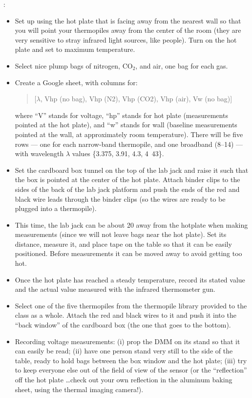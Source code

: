 :
	\begin{itemize}
	\item Set up using the hot plate that is facing away from the nearest wall so that you will point your thermopiles away from the center of the room (they are very sensitive to stray infrared light sources, like people). Turn on the hot plate and set to maximum temperature.
	\item Select nice plump bags of nitrogen, $\text{CO}_2$, and air, one bag for each gas.
	\item Create a Google sheet, with columns for: 
		\begin{quote}
		[$\lambda$, Vhp (no bag), Vhp (N2), Vhp (CO2), Vhp (air), Vw (no bag)]%
		\end{quote}
	where ``V'' stands for voltage, ``hp'' stands for hot plate (measurements pointed at the hot plate), and ``w'' stands for wall (baseline measurements pointed at the wall, at approximately room temperature). There will be five rows --- one for each narrow-band thermopile, and one broadband (8--\unit{14}{\micro\meter}) --- with wavelength $\lambda$ values \{3.375, 3.91, 4.3, \unit{4.43}{\micro\meter}\}.
	\item Set the cardboard box tunnel on the top of the lab jack and raise it such that the box is pointed at the center of the hot plate.  Attach binder clips to the sides of the back of the lab jack platform and push the ends of the red and black wire leads through the binder clips (so the wires are ready to be plugged into a thermopile).  
	\item This time, the lab jack can be about \unit{20}{\centi\meter} away from the hotplate when making measurements (since we will not leave bags near the hot plate). Set its distance, measure it, and place tape on the table so that it can be easily positioned.  Before measurements it can be moved away to avoid getting too hot.
	\item Once the hot plate has reached a steady temperature, record its stated value and the actual value measured with the infrared thermometer gun.
	\item Select one of the five thermopiles from the thermopile library provided to the class as a whole. Attach the red and black wires to it and push it into the ``back window'' of the cardboard box (the one that goes to the bottom).
	\item Recording voltage measurements: (i) prop the DMM on its stand so that it can easily be read; (ii) have one person stand very still to the side of the table, ready to hold bags between the box window and the hot plate; (iii) try to keep everyone else out of the field of view of the sensor (or the ``reflection'' off the hot plate \ldots check out your own reflection in the aluminum baking sheet, using the thermal imaging camera!).

\end{itemize}
